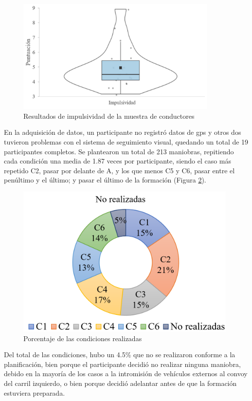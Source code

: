 \begin{figure}[h]
    \centering
    \includegraphics[width=10cm]
    {figures/5.6.png}
    \caption{ \label{fig:5.6} Resultados de impulsividad de la muestra de conductores}
\end{figure}

En la adquisición de datos, un participante no registró datos de \gls{gps} y otros dos tuvieron problemas con el sistema de seguimiento visual, quedando un total de 19 participantes completos. Se plantearon un total de 213 maniobras, repitiendo cada condición una media de 1.87 veces por participante, siendo el caso más repetido C2, pasar por delante de A, y los que menos C5 y C6, pasar entre el penúltimo y el último; y pasar el último de la formación (Figura \ref{fig:5.7}).

\begin{figure}[h]
    \centering
    \includegraphics[width=11cm]
    {figures/5.7.png}
    \caption{ \label{fig:5.7} Porcentaje de las condiciones realizadas}
\end{figure}

Del total de las condiciones, hubo un 4.5\% que no se realizaron conforme a la planificación, bien porque el participante decidió no realizar ninguna maniobra, debido en la mayoría de los casos a la intromisión de vehículos externos al convoy del carril izquierdo, o bien porque decidió adelantar antes de que la formación estuviera preparada. 


